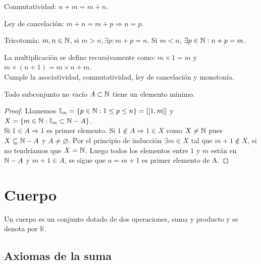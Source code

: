 \begin{prop}
    Conmutatividad: \(n+m = m+n\).
\end{prop}

\begin{prop}
    Ley de cancelación: \(m+n = m+p \Rightarrow n=p\).
\end{prop}

\begin{prop}
    Tricotomía: \(m,n \in \mathbb{N} \), si \(m > n, \exists p:m+p=n\). Si \(m < n\),  \(\exists p \in \mathbb{N} :n+p=m\).
\end{prop}

\begin{definition}
    La multiplicación se define recursivamente como: \(m \times 1 =m\) y \(m \times (n+1) = m \times n + m\). \\
    Cumple la asociatividad, conmutatividad, ley de cancelación y monotonía.
\end{definition}

\begin{theorem}
    Todo subconjunto no vacío \(A \subset \mathbb{N} \) tiene un elemento mínimo.
    \begin{proof}
        Llamemos \(\mathbb{I}_m = \{ p \in \mathbb{N} : 1 \leq p \leq n \} = \left[ {\left[ 1, m \right]} \right]\) y \(X = \{ m \in \mathbb{N} : \mathbb{I}_m \subset \mathbb{N} - A \} \). \\
        Si \(1 \in A \Rightarrow 1\) es primer elemento.
        Si \(1 \notin A \Rightarrow 1 \in X\) como \(X \neq \mathbb{N} \) pues \(X \subseteq \mathbb{N} - A\) y \(A \neq \varnothing \).
        Por el principio de inducción \(\exists m \in X\) tal que \(m+1 \notin X\), si no tendríamos que \(X = \mathbb{N} \). Luego todos los elementos entre \(1\) y \(m\) están en \(\mathbb{N} - A\) y \(m+1 \in A\), se sigue que \(a = m+1\) es primer elemento de A.
    \end{proof}
\end{theorem}

\section{Cuerpo}

Un cuerpo es un conjunto dotado de dos operaciones, suma y producto y se denota por \(\mathbb{K} \).

\subsection{Axiomas de la suma}

